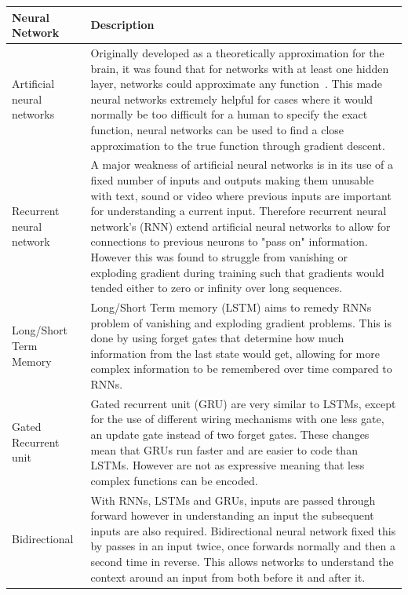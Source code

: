 \begin{longtable}{|p{3.5cm}|p{12cm}|} \hline
    \textbf{Neural Network} & \textbf{Description} \\ \hline
    Artificial neural networks \citep{ANN} & Originally developed as a theoretically approximation for the brain, it
        was found that for networks with at least one hidden layer, networks could approximate any
        function~\citep{csaji2001approximation}. This made neural networks extremely helpful for cases where it would
        normally be too difficult for a human to specify the exact function, neural networks can be used to find a
        close approximation to the true function through gradient descent. \\ \hline

    Recurrent neural network~\citep{RNN} & A major weakness of artificial neural networks is in its use of a fixed
        number of inputs and outputs making them unusable with text, sound or video where previous inputs are important
        for understanding a current input. Therefore recurrent neural network's (RNN) extend artificial neural networks
        to allow for connections to previous neurons to "pass on" information. However this was found to struggle from
        vanishing or exploding gradient during training such that gradients would tended either to zero or infinity
        over long sequences. \\ \hline

    Long/Short Term Memory \citep{LSTM} & Long/Short Term memory (LSTM) aims to remedy RNNs problem of vanishing and
        exploding gradient problems. This is done by using forget gates that determine how much information from the
        last state would get, allowing for more complex information to be remembered over time compared to RNNs. \\ \hline

    Gated Recurrent unit~\citep{GRU} & Gated recurrent unit (GRU) are very similar to LSTMs, except for the use of
        different wiring mechanisms with one less gate, an update gate instead of two forget gates. These changes mean
        that GRUs run faster and are easier to code than LSTMs. However are not as expressive meaning that less complex
        functions can be encoded. \\ \hline

    Bidirectional \citep{Bidirectional} & With RNNs, LSTMs and GRUs, inputs are passed through forward however in
        understanding an input the subsequent inputs are also required. Bidirectional neural network fixed this by
        passes in an input twice, once forwards normally and then a second time in reverse. This allows networks to
        understand the context around an input from both before it and after it. \\ \hline


\end{longtable}
